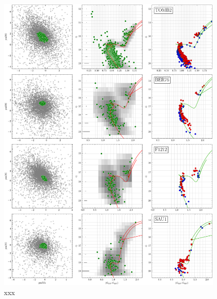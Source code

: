 \documentclass{aa}
\begin{document}
\begin{appendix}
 \begin{figure}
  \centering
  \includegraphics[height=.95\textheight]{figs/4_fpars.png}
  \caption{xxx}
  \label{fig:4fpars}
 \end{figure}


\end{appendix}
\end{document}

